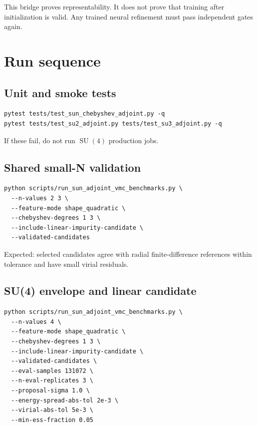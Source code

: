 \documentclass[11pt]{article}
\newcommand{\SU}{\operatorname{SU}}
\begin{document}
This bridge proves representability. It does not prove that training after initialization is valid. Any trained neural refinement must pass independent gates again.

\section{Run sequence}

\subsection{Unit and smoke tests}

\begin{lstlisting}[style=bashstyle]
pytest tests/test_sun_chebyshev_adjoint.py -q
pytest tests/test_su2_adjoint.py tests/test_su3_adjoint.py -q
\end{lstlisting}

If these fail, do not run \(\SU(4)\) production jobs.

\subsection{Shared small-N validation}

\begin{lstlisting}[style=bashstyle]
python scripts/run_sun_adjoint_vmc_benchmarks.py \
  --n-values 2 3 \
  --feature-mode shape_quadratic \
  --chebyshev-degrees 1 3 \
  --include-linear-impurity-candidate \
  --validated-candidates
\end{lstlisting}

Expected: selected candidates agree with radial finite-difference references within tolerance and have small virial residuals.

\subsection{SU(4) envelope and linear candidate}

\begin{lstlisting}[style=bashstyle]
python scripts/run_sun_adjoint_vmc_benchmarks.py \
  --n-values 4 \
  --feature-mode shape_quadratic \
  --chebyshev-degrees 1 3 \
  --include-linear-impurity-candidate \
  --validated-candidates \
  --eval-samples 131072 \
  --n-eval-replicates 3 \
  --proposal-sigma 1.0 \
  --energy-spread-abs-tol 2e-3 \
  --virial-abs-tol 5e-3 \
  --min-ess-fraction 0.05
\end{lstlisting}
\end{document}
